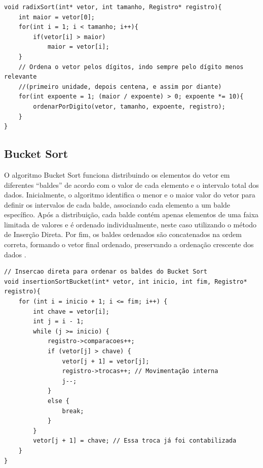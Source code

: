 \documentclass[12pt]{article}
\begin{document}
\begin{lstlisting}
void radixSort(int* vetor, int tamanho, Registro* registro){
    int maior = vetor[0];
    for(int i = 1; i < tamanho; i++){
        if(vetor[i] > maior)
            maior = vetor[i];
    }
    // Ordena o vetor pelos dígitos, indo sempre pelo dígito menos relevante 
    //(primeiro unidade, depois centena, e assim por diante)
    for(int expoente = 1; (maior / expoente) > 0; expoente *= 10){
        ordenarPorDigito(vetor, tamanho, expoente, registro);
    }
}
\end{lstlisting}

\subsection{Bucket Sort}

O algoritmo Bucket Sort funciona distribuindo os elementos do vetor em diferentes “baldes” de acordo com o valor de cada elemento e o intervalo total dos dados. Inicialmente, o algoritmo identifica o menor e o maior valor do vetor para definir os intervalos de cada balde, associando cada elemento a um balde específico. Após a distribuição, cada balde contém apenas elementos de uma faixa limitada de valores e é ordenado individualmente, neste caso utilizando o método de Inserção Direta. Por fim, os baldes ordenados são concatenados na ordem correta, formando o vetor final ordenado, preservando a ordenação crescente dos dados \cite{cormen2009}.

\begin{lstlisting}
// Insercao direta para ordenar os baldes do Bucket Sort
void insertionSortBucket(int* vetor, int inicio, int fim, Registro* registro){
    for (int i = inicio + 1; i <= fim; i++) {
        int chave = vetor[i];
        int j = i - 1;
        while (j >= inicio) {
            registro->comparacoes++;
            if (vetor[j] > chave) {
                vetor[j + 1] = vetor[j];
                registro->trocas++; // Movimentação interna
                j--;
            } 
            else {
                break;
            }
        }
        vetor[j + 1] = chave; // Essa troca já foi contabilizada
    }
}
\end{lstlisting}
\end{document}
